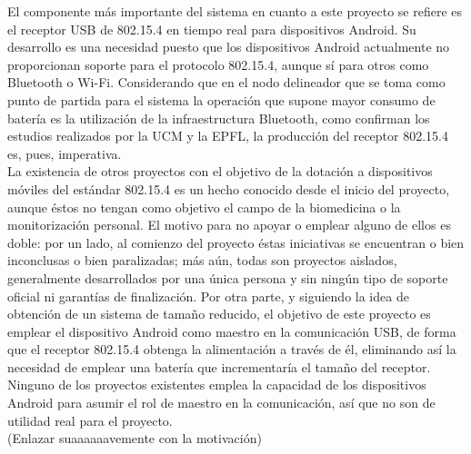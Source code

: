 	El componente más importante del sistema en cuanto a este proyecto se refiere es el receptor USB de 802.15.4 en tiempo real para dispositivos Android. Su desarrollo es una necesidad puesto que los dispositivos Android actualmente no proporcionan soporte para el protocolo 802.15.4, aunque sí para otros como Bluetooth o Wi-Fi. Considerando que en el nodo delineador que se toma como punto de partida para el sistema la operación que supone mayor consumo de batería es la utilización de la infraestructura Bluetooth, como confirman los estudios realizados por la UCM y la EPFL, la producción del receptor 802.15.4 es, pues, imperativa.\\

	La existencia de otros proyectos con el objetivo de la dotación a dispositivos móviles del estándar 802.15.4 es un hecho conocido desde el inicio del proyecto, aunque éstos no tengan como objetivo el campo de la biomedicina o la monitorización personal. El motivo para no apoyar o emplear alguno de ellos es doble: por un lado, al comienzo del proyecto éstas iniciativas se encuentran o bien inconclusas o bien paralizadas; más aún, todas son proyectos aislados, generalmente desarrollados por una única persona y sin ningún tipo de soporte oficial ni garantías de finalización. Por otra parte, y siguiendo la idea de obtención de un sistema de tamaño reducido, el objetivo de este proyecto es emplear el dispositivo Android como maestro en la comunicación USB, de forma que el receptor 802.15.4 obtenga la alimentación a través de él, eliminando así la necesidad de emplear una batería que incrementaría el tamaño del receptor. Ninguno de los proyectos existentes emplea la capacidad de los  dispositivos Android para asumir el rol de maestro en la comunicación, así que no son de utilidad real para el proyecto.\\

	(Enlazar suaaaaaavemente con la motivación)